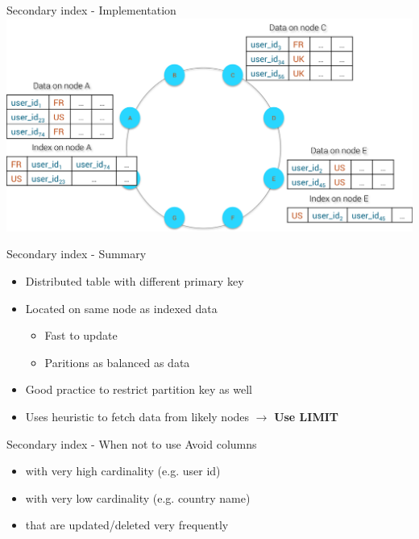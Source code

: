 \documentclass[
  10pt
]{beamer}
\begin{document}
\begin{frame}{Secondary index - Implementation}
  \includegraphics[width=1.0\textwidth]{resources/distributed_index.png}
\end{frame}

\begin{frame}{Secondary index - Summary}
  \begin{itemize}
    \item<1-> Distributed table with different primary key
    \item<2-> Located on same node as indexed data
      \begin{itemize}
        \item Fast to update
        \item Paritions as balanced as data
      \end{itemize}
    \item<3-> Good practice to restrict partition key as well
    \item<4-> Uses heuristic to fetch data from likely nodes $\rightarrow$ \textbf{Use LIMIT}
  \end{itemize}
\end{frame}

\begin{frame}{Secondary index - When not to use}
  Avoid columns
  \begin{itemize}
    \item<1-> with very high cardinality (e.g. user id)
    \item<2-> with very low cardinality (e.g. country name)
    \item<3-> that are updated/deleted very frequently
  \end{itemize}
\end{frame}
\end{document}
